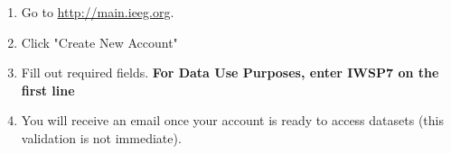 \documentclass[10pt]{article}
\begin{document}
\begin{enumerate}
    \item Go to \url{http://main.ieeg.org}.
    \item Click "Create New Account"
    \item Fill out required fields. {\bf For {\bf Data Use Purposes}, enter {\bf IWSP7} on the first line}
    \item You will receive an email once your account is ready to access datasets (this validation is not immediate).
\end{enumerate}
\end{document}

